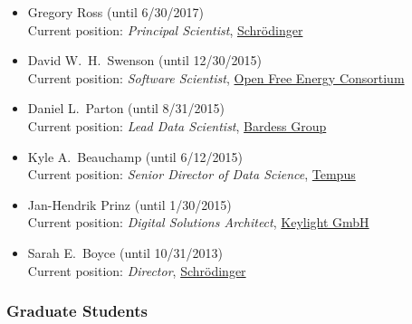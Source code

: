 \documentclass[10pt]{article}
\begin{document}
\begin{itemize}
  \item Gregory Ross (until 6/30/2017)\\
  Current position: \emph{Principal Scientist}, \href{http://www.schrodinger.com}{{ Schr\"{o}dinger}}
  
  \item David W.~H.~Swenson (until 12/30/2015)\\
  Current position: \emph{Software Scientist}, \href{http://openfree.energy}{Open Free Energy Consortium}
  
  \item Daniel L.~Parton (until 8/31/2015)\\
  Current position: \emph{Lead Data Scientist}, \href{http://www.bardess.com/}{{Bardess Group}}
  
  \item Kyle A.~Beauchamp (until 6/12/2015)\\
  Current position: \emph{Senior Director of Data Science}, \href{http://www.tempus.com}{{Tempus}}
  
  \item Jan-Hendrik Prinz (until 1/30/2015)\\
  Current position: \emph{Digital Solutions Architect}, \href{http://www.keylight.de/}{{Keylight GmbH}}
  
  \item Sarah E.~Boyce (until 10/31/2013)\\
  Current position: \emph{Director},  \href{http://www.schrodinger.com}{{Schr\"{o}dinger}}

\end{itemize}

\subsubsection*{Graduate Students}
\end{document}
